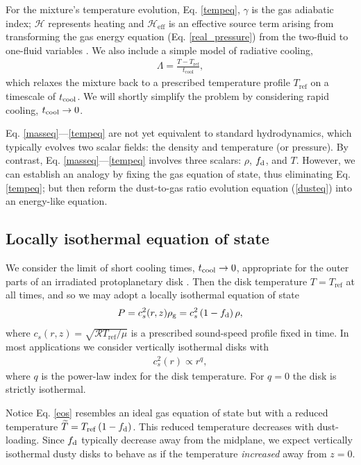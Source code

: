 For the mixture's temperature evolution, Eq. \ref{tempeq}, 
$\gamma$ is 
the gas adiabatic index; $\mathcal{H}$ represents heating and $\mathcal{H}_\mathrm{eff}$ 
is an effective source term arising from transforming the gas energy equation (Eq. \ref{real_pressure}) 
from the 
two-fluid to one-fluid variables \citep[see][ for 
details]{laibe14}. We also include a simple model of radiative
cooling, 
\begin{align}
  \Lambda = \frac{T -
    T_\mathrm{ref}}{t_\mathrm{cool}}, \label{cooling} 
\end{align}
which relaxes the mixture back to a prescribed temperature profile   
$T_\mathrm{ref}$ on a timescale of $t_\mathrm{cool}$. We will shortly simplify
the problem by considering rapid cooling, $t_\mathrm{cool}\to0$. 

Eq. \ref{masseq}---\ref{tempeq} are not yet equivalent to standard 
hydrodynamics, which typically evolves two scalar fields: the density and
temperature (or pressure). By contrast, Eq. \ref{masseq}---\ref{tempeq}
involves three scalars: $\rho$, $f_\mathrm{d}$, and $T$. 
However, we can establish an  analogy by fixing the gas
equation of state, thus eliminating Eq. \ref{tempeq}; but then reform 
the dust-to-gas ratio evolution equation (\ref{dusteq}) into an
energy-like equation. 

\subsection{Locally isothermal equation of state}\label{loc_iso_eos}
We consider the limit of short cooling 
times, $t_\mathrm{cool}\to 0$, appropriate for the outer parts of an irradiated
protoplanetary disk \citep{chiang97,lin15}. Then the disk temperature
$T = T_\mathrm{ref}$ at all times, and so we may
adopt a locally isothermal equation of state 
\begin{align}\label{eos}
  P = c_s^2(r,z)\rho_\mathrm{g} = c_s^{2}\left(1 - f_\mathrm{d}\right)\rho,   
\end{align}
where $c_s(r,z)= \sqrt{\mathcal{R}T_\mathrm{ref}/\mu}$ is a prescribed
sound-speed profile fixed in time. In most applications we consider vertically 
isothermal disks with \begin{align}\label{power_temp}
  c_s^2(r) \propto r^{q},
\end{align}
where $q$ is the power-law index for the disk temperature. For $q=0$
the disk is strictly isothermal.  

Notice Eq. \ref{eos} resembles an ideal gas equation of state but with  
a reduced temperature $\widetilde{T} = 
T_\mathrm{ref}\left(1-f_\mathrm{d}\right)$. %
This reduced temperature decreases with dust-loading. 
Since $f_\mathrm{d}$ typically decrease away from the midplane, we expect
vertically isothermal dusty disks to behave as if the temperature
\emph{increased} away from $z=0$.     

